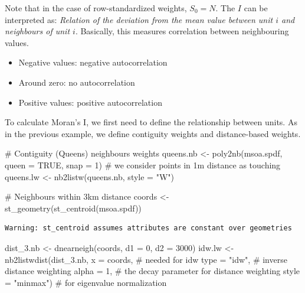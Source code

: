 \documentclass[
  letterpaper,
]{scrbook}
\newenvironment{Shaded}{\begin{snugshade}}{\end{snugshade}}
\newcommand{\AttributeTok}[1]{\textcolor[rgb]{0.40,0.45,0.13}{#1}}
\newcommand{\CommentTok}[1]{\textcolor[rgb]{0.37,0.37,0.37}{#1}}
\newcommand{\ConstantTok}[1]{\textcolor[rgb]{0.56,0.35,0.01}{#1}}
\newcommand{\DecValTok}[1]{\textcolor[rgb]{0.68,0.00,0.00}{#1}}
\newcommand{\FunctionTok}[1]{\textcolor[rgb]{0.28,0.35,0.67}{#1}}
\newcommand{\NormalTok}[1]{\textcolor[rgb]{0.00,0.23,0.31}{#1}}
\newcommand{\OtherTok}[1]{\textcolor[rgb]{0.00,0.23,0.31}{#1}}
\newcommand{\StringTok}[1]{\textcolor[rgb]{0.13,0.47,0.30}{#1}}
\begin{document}
Note that in the case of row-standardized weights, \(S_0 = N\). The
\(I\) can be interpreted as: \emph{Relation of the deviation from the
mean value between unit \(i\) and neighbours of unit \(i\)}. Basically,
this measures correlation between neighbouring values.

\begin{itemize}
\item
  Negative values: negative autocorrelation
\item
  Around zero: no autocorrelation
\item
  Positive values: positive autocorrelation
\end{itemize}

To calculate Moran's I, we first need to define the relationship between
units. As in the previous example, we define contiguity weights and
distance-based weights.

\begin{Shaded}
\begin{Highlighting}[]
\CommentTok{\# Contiguity (Queens) neighbours weights}
\NormalTok{queens.nb }\OtherTok{\textless{}{-}} \FunctionTok{poly2nb}\NormalTok{(msoa.spdf, }
                     \AttributeTok{queen =} \ConstantTok{TRUE}\NormalTok{, }
                     \AttributeTok{snap =} \DecValTok{1}\NormalTok{) }\CommentTok{\# we consider points in 1m distance as \textquotesingle{}touching\textquotesingle{}}
\NormalTok{queens.lw }\OtherTok{\textless{}{-}} \FunctionTok{nb2listw}\NormalTok{(queens.nb,}
                      \AttributeTok{style =} \StringTok{"W"}\NormalTok{)}

\CommentTok{\# Neighbours within 3km distance}
\NormalTok{coords }\OtherTok{\textless{}{-}} \FunctionTok{st\_geometry}\NormalTok{(}\FunctionTok{st\_centroid}\NormalTok{(msoa.spdf))}
\end{Highlighting}
\end{Shaded}

\begin{verbatim}
Warning: st_centroid assumes attributes are constant over geometries
\end{verbatim}

\begin{Shaded}
\begin{Highlighting}[]
\NormalTok{dist\_3.nb }\OtherTok{\textless{}{-}} \FunctionTok{dnearneigh}\NormalTok{(coords, }
                        \AttributeTok{d1 =} \DecValTok{0}\NormalTok{, }\AttributeTok{d2 =} \DecValTok{3000}\NormalTok{)}
\NormalTok{idw.lw }\OtherTok{\textless{}{-}} \FunctionTok{nb2listwdist}\NormalTok{(dist\_3.nb,}
                       \AttributeTok{x =}\NormalTok{ coords, }\CommentTok{\# needed for idw}
                       \AttributeTok{type =} \StringTok{"idw"}\NormalTok{, }\CommentTok{\# inverse distance weighting}
                       \AttributeTok{alpha =} \DecValTok{1}\NormalTok{, }\CommentTok{\# the decay parameter for distance weighting}
                       \AttributeTok{style =} \StringTok{"minmax"}\NormalTok{) }\CommentTok{\# for eigenvalue normalization}
\end{Highlighting}
\end{Shaded}
\end{document}
